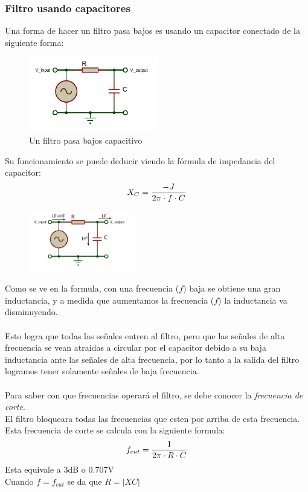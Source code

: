 \documentclass[../main.tex]{subfiles}
\begin{document}
		\subsubsection{Filtro usando capacitores}
		Una forma de hacer un filtro pasa bajos es usando un capacitor conectado 
		de la siguiente forma:
		\begin{figure}[H]
			\centering
			\includegraphics[width=0.5\textwidth]{filtros/pasa-bajo_cap1.pdf}
			\caption{Un filtro pasa bajos capacitivo}
		\end{figure}
		Su funcionamiento se puede deducir viendo la fórmula de impedancia del capacitor:
		\[
			X_C = \dfrac{-J}{2\pi \cdot f \cdot C}
		\]
		\begin{figure}
			\centering
			\includegraphics[width=0.4\textwidth]{filtros/pasa-bajo_cap2.pdf}
			\caption{}
		\end{figure}
		Como se ve en la formula, con una frecuencia ($f$) baja se obtiene una gran 
		inductancia, y a medida que aumentamos la frecuencia ($f$) la inductancia va 
		disminuyendo. \\\\
		Esto logra que todas las señales entren al filtro, pero que las señales de alta
		frecuencia se vean atraidas a circular por el capacitor debido a su baja inductancia
		ante las señales de alta frecuencia, por lo tanto a la salida del filtro logramos
		tener solamente señales de baja frecuencia. \\\\
		Para saber con que frecuencias operará el filtro, se debe conocer la
		\emph{frecuencia de corte}.\\
		El filtro bloqueara todas las frecuencias que esten por arriba
		de esta frecuencia.\\
		Esta frecuencia de corte se calcula con la siguiente formula:
		\[
			f_{cut} = \dfrac{1}{2\pi \cdot R \cdot C}
		\]
		Esta equivale a 3dB o 0.707V\\
		Cuando $f = f_{cut}$ se da que $R = \left | XC \right |$
\end{document}
